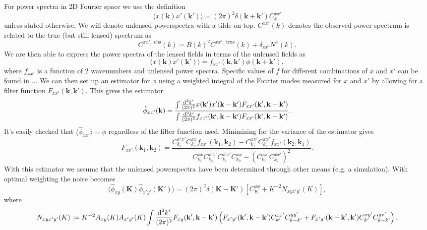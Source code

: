 \documentclass[11pt]{article} %
\DeclareRobustCommand{\d}{\ifmmode\text{d}\else d\fi}
\newcommand{\br}[1]{\ensuremath{\left( #1 \right)}}
\begin{document}
For power spectra in 2D Fourier space we use the definition
\begin{equation*}
    \langle x(\mathbf k)x'(\mathbf k') \rangle = (2\pi)^2\delta(\mathbf k + \mathbf k')C_k^{xx'}
\end{equation*}
unless stated otherwise. We will denote unlensed powerspectra with a tilde on top. $C^{xx'}(k)$ denotes the observed power spectrum is related to the true (but still lensed) spectrum as
\begin{equation*}
    C^{xx', \text{ obs}}(k) = B(k)^2C^{xx', \text{ true}}(k) + \delta_{xx'}N^x(k).
\end{equation*}
We are then able to express the power spectra of the lensed fields in terms of the unlensed fields as
\begin{equation*}
    \langle x(\mathbf k)x'(\mathbf k') \rangle = f_{xx'}(\mathbf k, \mathbf k') \phi(\mathbf k + \mathbf k'),
\end{equation*}
where $f_{xx'}$ is a function of 2 wavenumbers and unlensed power spectra. Specific values of $f$ for different combinations of $x$ and $x'$ can be found in ... %
We can then set up an estimator for $\phi$ using a weighted integral of the Fourier modes measured for $x$ and $x'$ by allowing for a filter function $F_{xx'}(\mathbf k, \mathbf k')$. This gives the estimator
\begin{equation*}
    \hat\phi_{xx'}(\mathbf k) = \frac{\int \frac{\d^2k'}{(2\pi)^2}x(\mathbf k')x'(\mathbf k - \mathbf k') F_{xx'}(\mathbf k', \mathbf k - \mathbf k')}{\int \frac{\d^2k'}{(2\pi)^2}f_{xx'}(\mathbf k', \mathbf k - \mathbf k') F_{xx'}(\mathbf k', \mathbf k - \mathbf k')}.
\end{equation*}
It's easily checked that $\langle \hat\phi_{xx'} \rangle = \phi$ regardless of the filter function used. Minimizing for the variance of the estimator gives
\begin{equation}
    F_{xx'}(\mathbf{k}_1, \mathbf{k}_2) = 
    \frac{C_{k_1}^{x'x'} C_{k_2}^{xx} f_{xx'}(\mathbf{k}_1, \mathbf{k}_2) 
    - C_{k_1}^{xx'} C_{k_2}^{xx'} f_{xx'}(\mathbf{k}_2, \mathbf{k}_1)}
    {C_{k_1}^{xx} C_{k_2}^{x'x'} C_{k_1}^{x'x'} C_{k_2}^{xx} 
    - \left( C_{k_1}^{xx'} C_{k_2}^{xx'} \right)^2}.
\end{equation}
With this estimator we assume that the unlensed powerspectra have been determined through other means (e.g. a simulation).
With optimal weighting the noise becomes
\begin{equation*}
    \langle \hat\phi_{xy}(\mathbf K) \hat\phi_{x'y'}(\mathbf K') \rangle = (2\pi)^2\delta(\mathbf K - \mathbf K') [C^{\phi \phi}_K + K^{-2}N_{xyx'y'}(K)],
\end{equation*}
where
\begin{equation*}
    N_{xyx'y'}(K):=K^{-2}A_{xy}(K)A_{x'y'}(K)\int\frac{\d^2 k'}{(2\pi)^2}F_{xy}(\mathbf k', \mathbf k - \mathbf k')\br{
        F_{x'y'}(\mathbf k', \mathbf k - \mathbf k') C_{k'}^{xx'}C^{yy'}_{k - k'} + F_{x'y'}(\mathbf k - \mathbf k', \mathbf k') C_{k'}^{xy'}C^{yx'}_{k - k'}
    }.
\end{equation*}
\end{document}
